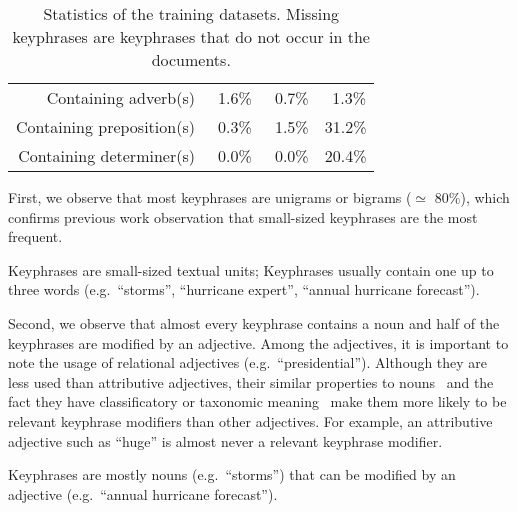 \begin{table}
\begin{tabular}{lr|ccc}
        \multicolumn{2}{r|}{Containing adverb(s)} & $~~$1.6\% & $~~$0.7\% & $~~$1.3\%\\
        \multicolumn{2}{r|}{Containing preposition(s)} & $~~$0.3\% & $~~$1.5\% & 31.2\%\\
        \multicolumn{2}{r|}{Containing determiner(s)} & $~~$0.0\% & $~~$0.0\% & 20.4\%\\
        \bottomrule
      \end{tabular}
      \caption{Statistics of the training datasets. Missing keyphrases are
               keyphrases that do not occur in the documents.
               \label{tab:train_dataset_statistics}}
    \end{table}

    First, we observe that most keyphrases are unigrams or bigrams
    ($\simeq$ 80\%), which confirms previous work observation that small-sized
    keyphrases are the most frequent.
    
    \begin{property}\label{prop:informativity}
      Keyphrases are small-sized textual units; Keyphrases usually contain one
      up to three words (e.g.~``storms'', ``hurricane expert'', ``annual
      hurricane forecast'').
    \end{property}

    Second, we observe that almost every keyphrase contains a noun and half of
    the keyphrases are modified by an adjective. Among the adjectives, it is
    important to note the usage of relational adjectives
    (e.g.~``presidential''). Although they are less used than attributive
    adjectives, their similar properties to
    nouns~\cite{bally1944linguistiquegeneraleetlinguistiquefrancaise} and the
    fact they have classificatory or taxonomic
    meaning~\cite{mcnally2004relationaladjectives} make them more likely to be
    relevant keyphrase modifiers than other adjectives. For example, an
    attributive adjective such as ``huge'' is almost never a relevant keyphrase
    modifier.

    \begin{property}\label{prop:noun_phrases}
      Keyphrases are mostly nouns (e.g.~``storms'') that can be modified by an
      adjective (e.g.~``annual hurricane forecast'').
    \end{property}

